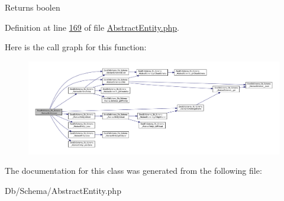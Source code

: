 \begin{DoxyReturn}{Returns}
boolen 
\end{DoxyReturn}


Definition at line \hyperlink{AbstractEntity_8php_source_l00169}{169} of file \hyperlink{AbstractEntity_8php_source}{Abstract\-Entity.\-php}.



Here is the call graph for this function\-:\nopagebreak
\begin{figure}[H]
\begin{center}
\leavevmode
\includegraphics[width=350pt]{classZendDbSchema__Db__Schema__AbstractEntity_a5b1c93da76c3708f90d330b4643e55b2_cgraph}
\end{center}
\end{figure}




The documentation for this class was generated from the following file\-:\begin{DoxyCompactItemize}
\item 
Db/\-Schema/Abstract\-Entity.\-php\end{DoxyCompactItemize}
